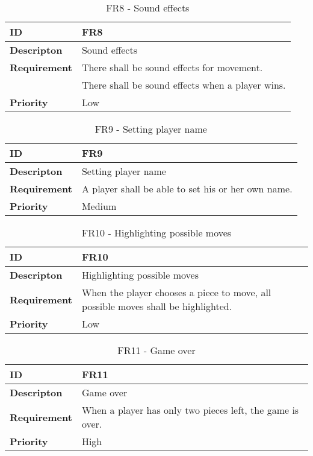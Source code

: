 \begin{table}[h!]
\begin{tabular}{ | p{90pt} | p{270pt}  |}
\hline
\bf ID &  FR8  \\ \hline
\bf Descripton & Sound effects \\ \hline 
\bf Requirement & There shall be sound effects for movement. \\
& There shall be sound effects when a player wins. \\ \hline
\bf Priority & Low \\ \hline

\end{tabular}
\caption{FR8 - Sound effects}
\end{table}

\begin{table}[h!]
\begin{tabular}{ | p{90pt} | p{270pt}  |}
\hline
\bf ID &  FR9 \\ \hline
\bf Descripton & Setting player name \\ \hline 
\bf Requirement & A player shall be able to set his or her own name.  \\ \hline
\bf Priority & Medium \\ \hline

\end{tabular}
\caption{FR9 - Setting player name}
\end{table}

\begin{table}[h!]
\begin{tabular}{ | p{90pt} | p{270pt}  |}
\hline
\bf ID &  FR10  \\ \hline
\bf Descripton & Highlighting possible moves \\ \hline 
\bf Requirement & When the player chooses a piece to move, all possible moves shall be highlighted.  \\ \hline
\bf Priority & Low \\ \hline

\end{tabular}
\caption{FR10 - Highlighting possible moves}
\end{table}

\begin{table}[h!]
\begin{tabular}{ | p{90pt} | p{270pt}  |}
\hline
\bf ID &  FR11  \\ \hline
\bf Descripton & Game over \\ \hline 
\bf Requirement & When a player has only two pieces left, the game is over.  \\ \hline
\bf Priority & High \\ \hline

\end{tabular}
\caption{FR11 - Game over}
\end{table}


\pagebreak



